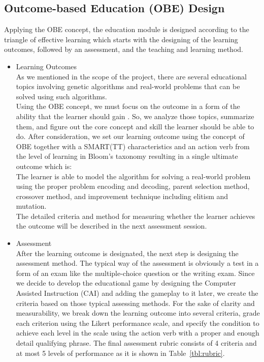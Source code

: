 \documentclass[12pt,oneside,openright,a4paper]{cpe-english-project}
\begin{document}
\subsection{Outcome-based Education (OBE) Design}
Applying the OBE concept, the education module is designed according to the triangle of effective learning which starts with the designing of the learning outcomes, followed by an assessment, and the teaching and learning method.

\begin{itemize}
	\item Learning Outcomes \\
	As we mentioned in the scope of the project, there are several educational topics involving genetic algorithms and real-world problems that can be solved using such algorithms. \\
	Using the OBE concept, we must focus on the outcome in a form of the ability that the learner should gain \cite{kmuttobe}. So, we analyze those topics, summarize them, and figure out the core concept and skill the learner should be able to do. After consideration, we set our learning outcome using the concept of OBE together with a SMART(TT) characteristics and an action verb from the level of learning in Bloom's taxonomy \cite{christine2021tophat} resulting in a single ultimate outcome which is: \\
	The learner is able to model the algorithm for solving a real-world problem using the proper problem encoding and decoding, parent selection method, crossover method, and improvement technique including elitism and mutation.\\
	The detailed criteria and method for measuring whether the learner achieves the outcome will be described in the next assessment session.

	\item Assessment \\
	After the learning outcome is designated, the next step is designing the assessment method. The typical way of the assessment is obviously a test in a form of an exam like the multiple-choice question or the writing exam. Since we decide to develop the educational game by designing the Computer Assisted Instruction (CAI) and adding the gameplay to it later, we create the criteria based on those typical assessing methods.
	For the sake of clarity and measurability, we break down the learning outcome into several criteria, grade each criterion using the Likert performance scale, and specify the condition to achieve each level in the scale using the action verb with a proper and enough detail qualifying phrase. The final assessment rubric consists of 4 criteria and at most 5 levels of performance as it is shown in Table~\ref{tbl:rubric}.


\end{itemize}
\end{document}
